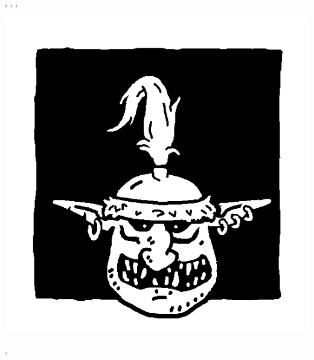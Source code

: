 \begin{multicols}{3}
\begin{center}
\vspace*{5pt}\frenzy{}, \unruly{}, \borntofight{}, 
\end{center}

\end{multicols}

\vspace*{-0.2cm}

\begin{multicols}{3}\raggedcolumns

\begin{center}
\includegraphics[width=\logosize]{pics/commongoblin.png}
\vspace*{-1cm}\subsubtitle{\commongoblin}

\vspace*{5pt}\unruly{}, \insignificant{}
\end{center}

\columnbreak


\end{multicols}
